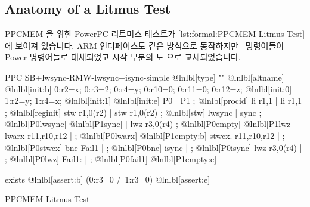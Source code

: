 \iffalse

The PPCMEM tool takes \emph{litmus tests} as input.
A sample litmus test is presented in
\cref{sec:formal:Anatomy of a Litmus Test}.
\Cref{sec:formal:What Does This Litmus Test Mean?}
relates this litmus test to the equivalent C-language program,
\cref{sec:formal:Running a Litmus Test} describes how to
apply PPCMEM to this litmus test, and
\cref{sec:formal:PPCMEM Discussion}
discusses the implications.

\fi

\subsection{Anatomy of a Litmus Test}
\label{sec:formal:Anatomy of a Litmus Test}

PPCMEM 을 위한 PowerPC 리트머스 테스트가
\cref{lst:formal:PPCMEM Litmus Test} 에 보여져 있습니다.
ARM 인터페이스도 같은 방식으로 동작하지만 \ARM\ 명령어들이 Power 명령어들로
대체되었고 시작 부분의  도  으로 교체되었습니다.

\iffalse

An example PowerPC litmus test for PPCMEM is shown in
\cref{lst:formal:PPCMEM Litmus Test}.
The ARM interface works the same way, but with \ARM\ instructions
substituted for the Power instructions and with the initial \qco{PPC}
replaced by \qco{ARM}.

\fi

\begin{listing}[tbp]
\begin{fcvlabel}
\begin{VerbatimL}[commandchars=\@\[\]]
PPC SB+lwsync-RMW-lwsync+isync-simple		@lnlbl[type]
""						@lnlbl[altname]
{						@lnlbl[init:b]
0:r2=x; 0:r3=2; 0:r4=y; 0:r10=0; 0:r11=0; 0:r12=z; @lnlbl[init:0]
1:r2=y; 1:r4=x;					@lnlbl[init:1]
}						@lnlbl[init:e]
 P0                 | P1           ;		@lnlbl[procid]
 li r1,1            | li r1,1      ;		@lnlbl[reginit]
 stw r1,0(r2)       | stw r1,0(r2) ;		@lnlbl[stw]
 lwsync             | sync         ; @lnlbl[P0lwsync] @lnlbl[P1sync]
                    | lwz r3,0(r4) ; @lnlbl[P0empty]  @lnlbl[P1lwz]
 lwarx  r11,r10,r12 | ;		@lnlbl[P0lwarx] @lnlbl[P1empty:b]
 stwcx. r11,r10,r12 | ;		@lnlbl[P0stwcx]
 bne Fail1          | ;		@lnlbl[P0bne]
 isync              | ;		@lnlbl[P0isync]
 lwz r3,0(r4)       | ;		@lnlbl[P0lwz]
 Fail1:             | ;		@lnlbl[P0fail1] @lnlbl[P1empty:e]

exists						@lnlbl[assert:b]
(0:r3=0 /\ 1:r3=0)				@lnlbl[assert:e]
\end{VerbatimL}
\end{fcvlabel}
\caption{PPCMEM Litmus Test}
\label{lst:formal:PPCMEM Litmus Test}
\end{listing}

